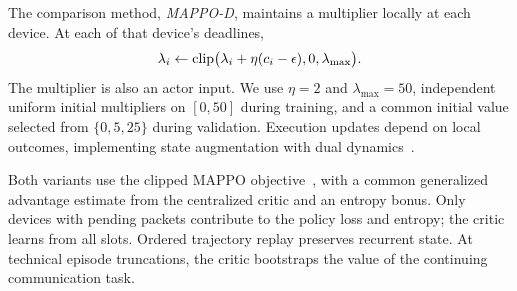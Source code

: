 The comparison method, \emph{MAPPO-D}, maintains a multiplier locally at each
device. At each of that device's deadlines,
\begin{equation}
\lambda_i\leftarrow\operatorname{clip}\bigl(\lambda_i+\eta(c_i-\epsilon),0,
                                  \lambda_{\max}\bigr).\label{eq:dual}
\end{equation}
The multiplier is also an actor input. We use $\eta=2$ and
$\lambda_{\max}=50$, independent uniform initial multipliers on $[0,50]$
during training, and a common
initial value selected from $\{0,5,25\}$ during validation. Execution updates
depend on local outcomes, implementing state augmentation with dual
dynamics~\cite{calvo2024}.

Both variants use the clipped MAPPO objective~\cite{yu2022}, with a common
generalized advantage estimate from the centralized critic and an entropy bonus.
Only devices with pending packets contribute to the policy loss and entropy;
the critic learns from all slots. Ordered trajectory replay preserves recurrent
state. At technical episode truncations, the critic bootstraps the value of
the continuing communication task.
